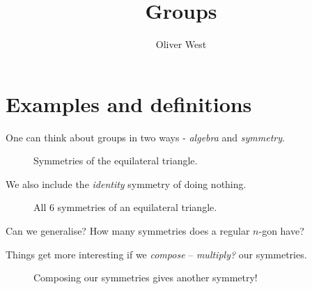 \documentclass{../../template/note}
\author{Oliver West}
\title{Groups}
\date{}
\begin{document}
    
    \maketitle

    \tableofcontents


    \section{Examples and definitions}

    One can think about groups in two ways - \emph{algebra} and \emph{symmetry}.

    \begin{figure}[ht]
        \centering
        \caption{Symmetries of the equilateral triangle.}
        \label{fig:equilateral-triangle-symmetry}
    \end{figure}
    
    \noindent We also include the \emph{identity} symmetry of doing nothing.

    \begin{figure}[ht]
        \centering
        \caption{All 6 symmetries of an equilateral triangle.}
        \label{fig:equilateral-triangle-all-symmetries}
    \end{figure}

    \begin{remark*}
        Can we generalise? How many symmetries does a regular \(n\)-gon have?
    \end{remark*}
    
    Things get more interesting if we \emph{compose} -- \emph{multiply?} our symmetries.

    \begin{figure}[ht]
        \centering
        \caption{Composing our symmetries gives another symmetry!}
        \label{fig:equilateral-triangle-composition-example*}
    \end{figure}
    
\end{document}
